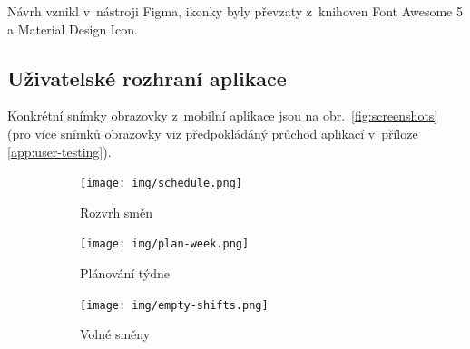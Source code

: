 \documentclass[twoside]{ctuthesis}
\begin{document}
Návrh vznikl v~nástroji Figma, ikonky byly převzaty z~knihoven Font Awesome 5 a Material Design Icon.

\subsection{Uživatelské rozhraní aplikace}

Konkrétní snímky obrazovky z~mobilní aplikace jsou na obr.~\ref{fig:screenshots} (pro více snímků obrazovky viz předpokládáný průchod aplikací v~příloze \ref{app:user-testing}).

\begin{figure}
	\begin{subfigure}{0.34\textwidth}
				 \texttt{[image: img/schedule.png]}
				 \caption{Rozvrh směn}
				 \label{sub:android1}
  \end{subfigure}
		 \hspace{1em}
	\begin{subfigure}{0.34\textwidth}
				 \texttt{[image: img/plan-week.png]}
				 \caption{Plánování týdne}
				 \label{sub:android2}
  \end{subfigure}
	\vspace{1em}
	\begin{subfigure}{0.34\textwidth}
         \texttt{[image: img/empty-shifts.png]}
         \caption{Volné směny}
         \label{sub:android3}
     \end{subfigure}
		 \hspace{1em}
	\begin{subfigure}{0.34\textwidth}


\end{subfigure}
\end{figure}
\end{document}
